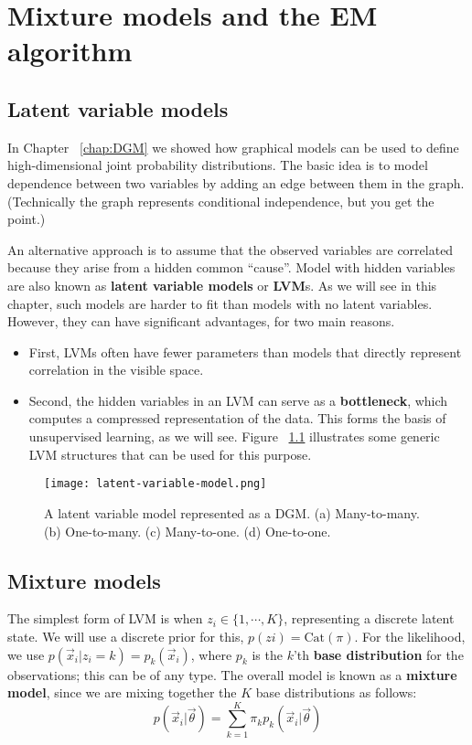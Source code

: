 \chapter{Mixture models and the EM algorithm}
\label{chap:EM-algorithm}


\section{Latent variable models}
In Chapter ~\ref{chap:DGM} we showed how graphical models can be used to define high-dimensional joint probability distributions. The basic idea is to model dependence between two variables by adding an edge between them in the graph. (Technically the graph represents conditional
independence, but you get the point.)

An alternative approach is to assume that the observed variables are correlated because they arise from a hidden common “cause”. Model with hidden variables are also known as \textbf{latent variable models} or \textbf{LVM}s. As we will see in this chapter, such models are harder to fit than models with no latent variables. However, they can have significant advantages, for two main reasons.
\begin{itemize}
\item{First, LVMs often have fewer parameters than models that directly represent correlation in the visible space.}
\item{Second, the hidden variables in an LVM can serve as a \textbf{bottleneck}, which computes a compressed representation of the data. This forms the basis of unsupervised learning, as we will see. Figure ~\ref{fig:latent-variable-model} illustrates some generic LVM structures that can be used for this purpose.}
\end{itemize}

\begin{figure}[hbtp]
\centering
    \texttt{[image: latent-variable-model.png]}
\caption{A latent variable model represented as a DGM. (a) Many-to-many. (b) One-to-many. (c) Many-to-one. (d) One-to-one.}
\label{fig:latent-variable-model} 
\end{figure}


\section{Mixture models}
The simplest form of LVM is when $z_i \in \{1,\cdots,K\}$, representing a discrete latent state. We will use a discrete prior for this, $p(zi)=\mathrm{Cat}(\pi)$. For the likelihood, we use $p(\vec{x}_i|z_i =k)=p_k(\vec{x}_i)$, where $p_k$ is the $k$'th \textbf{base distribution} for the observations; this can be of any type. The overall model is known as a \textbf{mixture model}, since we are mixing together the $K$ base distributions as follows:
\begin{equation}
p(\vec{x}_i|\vec{\theta})=\sum\limits_{k=1}^K \pi_kp_k(\vec{x}_i|\vec{\theta})
\end{equation}

